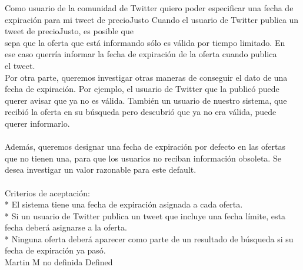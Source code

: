\vspace{20pt}

	{Como usuario de la comunidad de Twitter quiero poder especificar una fecha de expiración para mi tweet de precioJusto} %
	{Cuando el usuario de Twitter publica un tweet de precioJusto, es posible que\\
sepa que la oferta que está informando sólo es válida por tiempo limitado. En\\
ese caso querría informar la fecha de expiración de la oferta cuando publica\\
el tweet.\\
Por otra parte, queremos investigar otras maneras de conseguir el dato de una\\
fecha de expiración. Por ejemplo, el usuario de Twitter que la publicó puede\\
querer avisar que ya no es válida. También un usuario de nuestro sistema, que\\
recibió la oferta en su búsqueda pero descubrió que ya no era válida, puede\\
querer informarlo.\\
  \\
Además, queremos designar una fecha de expiración por defecto en las ofertas\\
que no tienen una, para que los usuarios no reciban información obsoleta. Se\\
desea investigar un valor razonable para este default.\\
  \\
Criterios de aceptación:\\
* El sistema tiene una fecha de expiración asignada a cada oferta.  \\
* Si un usuario de Twitter publica un tweet que incluye una fecha límite, esta fecha deberá asignarse a la oferta.  \\
* Ninguna oferta deberá aparecer como parte de un resultado de búsqueda si su fecha de expiración ya pasó.\\
} %
	{} %
	{} %
	{Martin M} %
	{no definida} %
	{Defined} %


\vspace{20pt}

